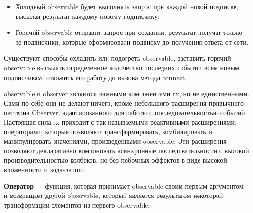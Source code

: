 \begin{itemize}
	\item Холодный \gls{observable} будет выполнять запрос при каждой новой подписке, высылая результат каждому новому подписчику;
	\item Горячий \gls{observable} отправит запрос при создании, результат получат только те подписчики, которые сформировали подписку до получения ответа от сети.
\end{itemize}

Существуют способы охладить или подогреть \gls{observable}, заставить горячий \gls{observable} высылать определённое количество последних событий всем новым подписчикам, отложить его работу до вызова метода connect.

\gls{observable} и observer являются важными компонентами \gls{rx}, но не единственными. Сами по себе они не делают ничего, кроме небольшого расширения привычного паттерна Observer, адаптированного для работы с последовательностью событий. Настоящая сила \gls{rx} приходит с так называемыми реактивными расширениями: операторами, которые позволяют трансформировать, комбинировать и манипулировать значениями, произведёнными \gls{observable}. Эти расширения позволяют декларативно компоновать асинхронные последовательности с высокой производительностью колбеков, но без побочных эффектов в виде высокой вложенности и кода-лапши.

\textbf{Оператор} --- функция, которая принимает \gls{observable} своим первым аргументом и возвращает другой \gls{observable}, который является результатом некоторой трансформации элементов из первого \gls{observable}.